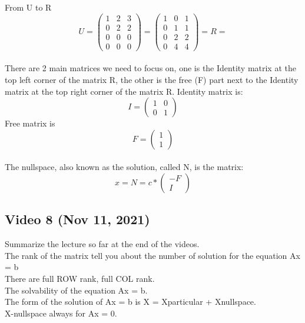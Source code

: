 From U to R
\begin{equation}
U = 
\left({\begin{array}{ccc} 1 & 2 & 3 \\ 0 & 2 & 2 \\ 0 & 0 & 0  \\ 0 & 0 & 0 \end{array}}\right)=
\left({\begin{array}{ccc} 1 & 0 & 1 \\ 0 & 1 & 1 \\ 0 & 2 & 2 \\ 0 & 4 & 4 \end{array}}\right)
= R =
\end{equation}
\\ There are 2 main matrices we need to focus on, one is the Identity matrix at the top left corner of the matrix R, the other is the free (F) part next to the Identity matrix at the top right corner of the matrix R.
Identity matrix is:
\begin{equation}
I = 
\left({\begin{array}{cc} 1 & 0 \\ 0 & 1 \end{array}}\right)
\end{equation}
Free matrix is
\begin{equation}
F =
\left({\begin{array}{c} 1 \\ 1 \end{array}}\right)
\end{equation}
\\ The nullspace, also known as the solution, called N, is the matrix:
\begin{equation}
x = N =
c * \left({\begin{array}{c} - F \\ I \end{array}}\right)
\end{equation}

\subsection{Video 8 (Nov 11, 2021)}

Summarize the lecture so far at the end of the videos.
\\The rank of the matrix tell you about the number of solution for the equation Ax = b
\\There are full ROW rank, full COL rank.
\\The solvability of the equation Ax = b.
\\The form of the solution of Ax = b is X = Xparticular + Xnullspace.
\\X-nullspace always for Ax = 0.

